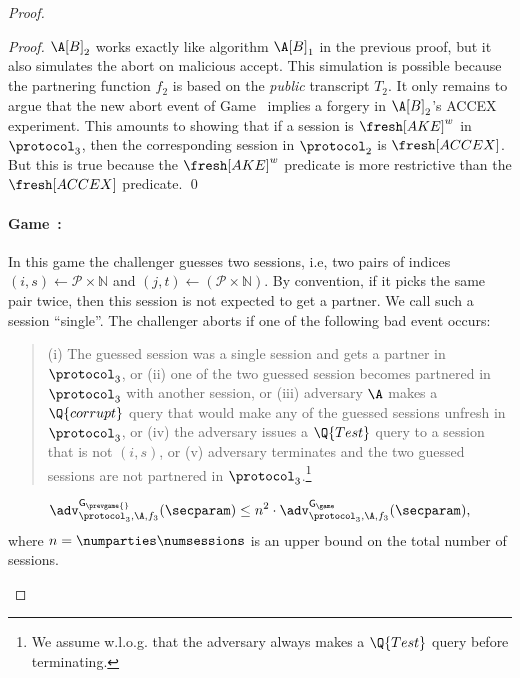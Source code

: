 \begin{proof}
\begin{proof}
$\A[B]_2$ works exactly like algorithm $\A[B]_1$ in the previous proof,
but it also simulates the abort on malicious
accept. 
This simulation is possible because the partnering function $f_2$ is based on the \emph{public} transcript $T_2$.
It only remains to argue that the new abort event of Game~\game{} implies a forgery in $\A[B]_2$'s ACCEX experiment.
This amounts to showing that if a session is $\fresh[AKE]^w$ in $\protocol_3$, 
then the corresponding session in $\protocol_2$ is $\fresh[ACCEX]$.
But this is true because the $\fresh[AKE]^w$ predicate is more restrictive than the $\fresh[ACCEX]$ predicate.
\qed
\end{proof}

\newgame
\paragraph{Game~\game:}
In this game the challenger guesses two sessions, i.e, two pairs of indices $(i,s) \gets \mathcal{P} \times \mathbb{N}$ and $(j,t) \gets (\mathcal{P} \times \mathbb{N})$. 
By convention,
if it picks the same pair twice, then this session is not expected  to get a partner.
We call such a session ``single''. 
The challenger aborts if one of the following bad event occurs:
\begin{quote}
(i) The guessed session was a single session and gets a partner in $\protocol_3$, or (ii) one of the two guessed session becomes partnered in $\protocol_3$ with another session, or (iii) adversary $\A$ makes a $\Q{corrupt}$ query that would make any of the guessed sessions unfresh in $\protocol_3$, or (iv) the adversary issues a $\Q{Test}$ query to a session that is not $(i,s)$, or (v) adversary terminates and the two guessed sessions are not partnered in $\protocol_3$.\footnote{We assume w.l.o.g. that the adversary always makes a $\Q{Test}$ query before terminating.}
\end{quote}

\begin{lemma}
\begin{equation}
	\adv_{\protocol_3,\A,f_3}^{\mathsf{G_{\prevgame{}}}}(\secparam) 
	\leq n^2 \cdot \adv_{\protocol_3,\A,f_3}^{\mathsf{G_\game}}(\secparam),
\end{equation}
where $n = \numparties\numsessions$ is an upper bound on the total number of sessions.
\end{lemma}


\end{proof}
